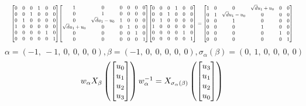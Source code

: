 \documentclass[11pt]{article}
\theoremstyle{definition}
\begin{document}
\[
\scaletoalign{\textwidth}{{\left[\begin{matrix}0 & 0 & 0 & 1 & 0 & 0\\0 & 0 & 1 & 0 & 0 & 0\\0 & 1 & 0 & 0 & 0 & 0\\1 & 0 & 0 & 0 & 0 & 0\\0 & 0 & 0 & 0 & 1 & 0\\0 & 0 & 0 & 0 & 0 & 1\end{matrix}\right]} {\left[\begin{matrix}1 & 0 & 0 & 0 & 0 & 0\\0 & 1 & 0 & 0 & 0 & 0\\0 & \sqrt{d} u_{1} - u_{0} & 1 & 0 & 0 & 0\\\sqrt{d} u_{1} + u_{0} & 0 & 0 & 1 & 0 & 0\\0 & 0 & 0 & 0 & 1 & 0\\0 & 0 & 0 & 0 & 0 & 1\end{matrix}\right]} {\left[\begin{matrix}0 & 0 & 0 & 1 & 0 & 0\\0 & 0 & 1 & 0 & 0 & 0\\0 & 1 & 0 & 0 & 0 & 0\\1 & 0 & 0 & 0 & 0 & 0\\0 & 0 & 0 & 0 & 1 & 0\\0 & 0 & 0 & 0 & 0 & 1\end{matrix}\right]} = {\left[\begin{matrix}1 & 0 & 0 & \sqrt{d} u_{1} + u_{0} & 0 & 0\\0 & 1 & \sqrt{d} u_{1} - u_{0} & 0 & 0 & 0\\0 & 0 & 1 & 0 & 0 & 0\\0 & 0 & 0 & 1 & 0 & 0\\0 & 0 & 0 & 0 & 1 & 0\\0 & 0 & 0 & 0 & 0 & 1\end{matrix}\right]}}
\]
\[
\alpha = \left( -1, \  -1, \  0, \  0, \  0, \  0\right), \beta = \left( -1, \  0, \  0, \  0, \  0, \  0\right), \sigma_{\alpha}(\beta) = \left( 0, \  1, \  0, \  0, \  0, \  0\right)
\]
\[
\scaletoalign{\textwidth}{w_{\alpha} X_{\beta}\left(\left[\begin{matrix}u_{0}\\u_{1}\\u_{2}\\u_{3}\end{matrix}\right]\right) w_{\alpha}^{-1} = X_{\sigma_{\alpha}\left(\beta\right)}\left(\left[\begin{matrix}u_{3}\\u_{1}\\u_{2}\\u_{0}\end{matrix}\right]\right)}
\]
\end{document}
